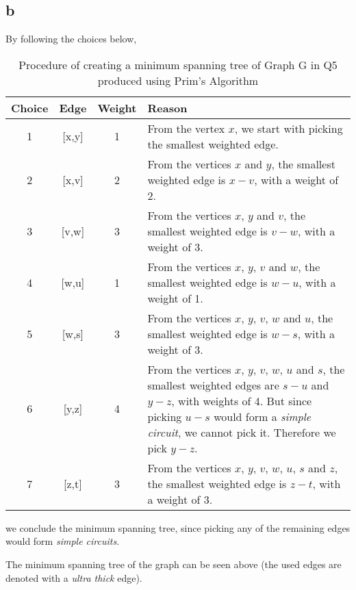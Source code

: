 \documentclass[11pt]{article}
\begin{document}
\subsection*{b}
By following the choices below, 
\begin{table}[H]
    \centering
    \renewcommand{\arraystretch}{1.25}
    \begin{tabular}{|c|c|c|p{114mm}|}	
    \hline 							
   \textbf{Choice} & \textbf{Edge} & \textbf{Weight} & \textbf{Reason} \\
    \hline 
    \hline 
    1 & [x,y] & 1 & From the vertex $x$, we start with picking the smallest weighted edge. \\ \hline
    2 & [x,v] & 2 & From the vertices $x$ and $y$, the smallest weighted edge is $x-v$, with a weight of 2. \\ \hline
    3 & [v,w] & 3 & From the vertices $x$, $y$ and $v$, the smallest weighted edge is $v-w$, with a weight of 3.\\ \hline
    4 & [w,u] & 1 & From the vertices $x$, $y$, $v$ and $w$, the smallest weighted edge is $w-u$, with a weight of 1.\\ \hline
    5 & [w,s] & 3 & From the vertices $x$, $y$, $v$, $w$ and $u$, the smallest weighted edge is $w-s$, with a weight of 3. \\ \hline
    6 & [y,z] & 4 & From the vertices $x$, $y$, $v$, $w$, $u$ and $s$, the smallest weighted edges are $s-u$ and $y-z$, with weights of 4. But since picking $u-s$ would form a \textit{simple circuit}, we cannot pick it. Therefore we pick $y-z$. \\ \hline
    7 & [z,t] & 3 & From the vertices $x$, $y$, $v$, $w$, $u$, $s$ and $z$, the smallest weighted edge is $z-t$, with a weight of 3. \\ \hline
    \end{tabular}
    \caption{ Procedure of creating a minimum spanning tree of Graph G in Q5 produced using Prim's Algorithm }
    \end{table}
    
we conclude the minimum spanning tree, since picking any of the remaining edges would form \textit{simple circuits}. 

The minimum spanning tree of the graph can be seen above (the used edges are denoted with a \textit{ultra thick} edge).
\end{document}
